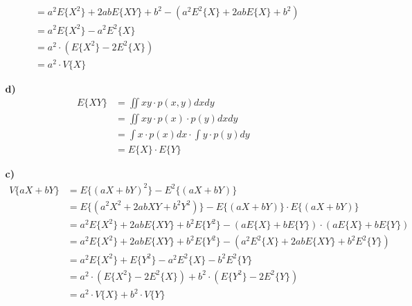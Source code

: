 \documentclass[a4paper,11pt]{article}
\begin{document}
\begin{enumerate}
\begin{enumerate}
\begin{align*}
		&= a^2E\lbrace X^2 \rbrace + 2abE\lbrace XY \rbrace + b^2 - (a^2E^2\lbrace X \rbrace + 2abE\lbrace X \rbrace + b^2) \\
		&= a^2E\lbrace X^2 \rbrace - a^2E^2\lbrace X \rbrace \\
		&= a^2 \cdot (E\lbrace X^2 \rbrace - 2E^2\lbrace X \rbrace) \\
		&= a^2 \cdot V\lbrace X \rbrace
		\end{align*}
		\item[\textbf{d)}]
		\begin{align*}
		E\lbrace XY \rbrace &= \iint xy \cdot p(x,y) dxdy \\
		&= \iint xy \cdot p(x) \cdot p(y) dxdy \\
		&= \int x \cdot p(x) dx \cdot \int y \cdot p(y) dy \\
		&= E\lbrace X \rbrace \cdot E\lbrace Y \rbrace
		\end{align*}
		\item[\textbf{c)}]
		\begin{align*}
		V\lbrace aX + bY \rbrace &= E\lbrace (aX + bY)^2 \rbrace - E^2\lbrace (aX + bY) \rbrace \\
		&= E\lbrace (a^2X^2 + 2abXY + b^2Y^2) \rbrace - E\lbrace (aX + bY) \rbrace \cdot
		E\lbrace (aX + bY) \rbrace \\
		&= a^2E\lbrace X^2 \rbrace + 2abE\lbrace XY \rbrace + b^2E\lbrace Y^2 \rbrace - (aE\lbrace X \rbrace + bE\lbrace Y \rbrace) \cdot (aE\lbrace X \rbrace + bE\lbrace Y \rbrace) \\
		&= a^2E\lbrace X^2 \rbrace + 2abE\lbrace XY \rbrace + b^2E\lbrace Y^2 \rbrace - (a^2E^2\lbrace X \rbrace + 2abE\lbrace XY \rbrace + b^2E^2\lbrace Y \rbrace) \\
		&= a^2E\lbrace X^2 \rbrace + E\lbrace Y^2 \rbrace - a^2E^2\lbrace X \rbrace - b^2E^2\lbrace Y \rbrace\\
		&= a^2 \cdot (E\lbrace X^2 \rbrace - 2E^2\lbrace X \rbrace) + b^2 \cdot (E\lbrace Y^2 \rbrace - 2E^2\lbrace Y \rbrace) \\
		&= a^2 \cdot V\lbrace X \rbrace + b^2 \cdot V\lbrace Y \rbrace
		\end{align*}
		\end{enumerate}
	\end{enumerate}
\end{document}
